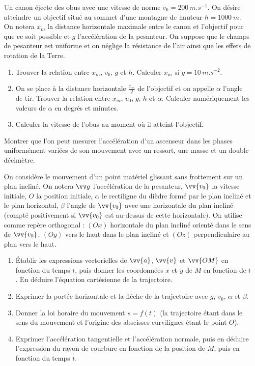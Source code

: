 \begin{exercice}
  Un canon éjecte des obus avec une vitesse de norme $v_0=\SI{200}{m.s^{-1}}$. On désire atteindre un objectif situé au sommet d'une montagne de hauteur $h=\SI{1000}{m}$. On notera $x_m$ la distance horizontale maximale entre le canon et l'objectif pour que ce soit possible et $g$ l'accélération de la pesanteur. On suppose que le champs de pesanteur est uniforme et on néglige la résistance de l'air ainsi que les effets de rotation de la Terre.
  \begin{enumerate}
  \item Trouver la relation entre $x_m$, $v_0$, $g$ et $h$. Calculer $x_m$ si $g=\SI{10}{m.s^{-2}}$.
  \item On se place à la distance horizontale $\frac{x_m}{2}$ de l'objectif et on appelle $\alpha$ l'angle de tir. Trouver la relation entre $x_m$, $v_0$, $g$, $h$ et $\alpha$. Calculer numériquement les valeurs de $\alpha$ en degrés et minutes.
  \item Calculer la vitesse de l'obus au moment où il atteint l'objectif.
  \end{enumerate}
\end{exercice}
%
\begin{exercice}[Accéléromètre]
  Montrer que l'on peut mesurer l'accélération d'un ascenseur dans les phases uniformément variées de son mouvement avec un ressort, une masse et un double décimètre.
\end{exercice}
%
\begin{exercice}
  On considère le mouvement d'un point matériel glissant sans frottement sur un plan incliné. On notera $\vg$ l'accélération de la pesanteur, $\vv{v_0}$ la vitesse initiale, $O$ la position initiale, $\alpha$ le rectiligne du dièdre formé par le plan incliné et le plan horizontal, $\beta$ l'angle de $\vv{v_0}$ avec une horizontale du plan incliné (compté positivement si $\vv{v_0}$ est au-dessus de cette horizontale). On utilise comme repère orthogonal : $(Ox)$ horizontale du plan incliné orienté dans le sens de $\vv{v_0}$, $(Oy)$ vers le haut dans le plan incliné et $(Oz)$ perpendiculaire au plan vers le haut.
  \begin{enumerate}
  \item Établir les expressions vectorielles de $\vv{a}$, $\vv{v}$ et $\vv{OM}$ en fonction du temps $t$, puis donner les coordonnées $x$ et $y$ de $M$ en fonction de $t$. En déduire l'équation cartésienne de la trajectoire.
  \item Exprimer la portée horizontale et la flèche de la trajectoire avec $g$, $v_0$, $\alpha$ et $\beta$.
  \item Donner la loi horaire du mouvement $s=f(t)$ (la trajectoire étant dans le sens du mouvement et l'origine des abscisses curvilignes étant le point $O$).
  \item Exprimer l'accélération tangentielle et l'accélération normale, puis en déduire l'expression du rayon de courbure en fonction de la position de $M$, puis en fonction du temps $t$.   
  \end{enumerate}
\end{exercice}
